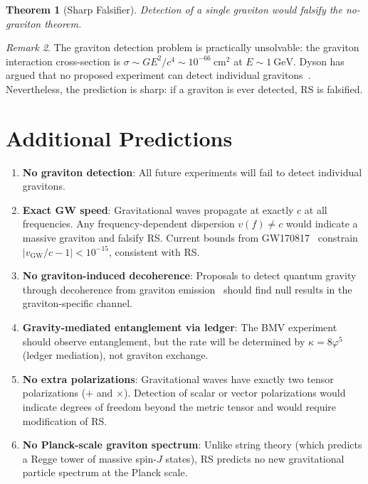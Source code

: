 \documentclass[12pt,a4paper]{article}
\newtheorem{theorem}{Theorem}[section]
\theoremstyle{definition}
\theoremstyle{remark}
\newtheorem{remark}[theorem]{Remark}
\begin{document}
\begin{theorem}[Sharp Falsifier]
\label{thm:falsifier}
Detection of a single graviton would falsify the no-graviton
theorem.
\end{theorem}

\begin{remark}
The graviton detection problem is practically unsolvable: the
graviton interaction cross-section is
$\sigma \sim G E^2/c^4 \sim 10^{-66}~\mathrm{cm}^2$ at
$E \sim 1~\mathrm{GeV}$.  Dyson has argued that no proposed
experiment can detect individual gravitons~\cite{Dyson2013}.
Nevertheless, the prediction is sharp: if a graviton is ever
detected, RS is falsified.
\end{remark}

\section{Additional Predictions}
\label{sec:predictions}

\begin{enumerate}
  \item \textbf{No graviton detection}: All future experiments
  will fail to detect individual gravitons.

  \item \textbf{Exact GW speed}: Gravitational waves propagate
  at exactly $c$ at all frequencies.  Any frequency-dependent
  dispersion $v(f) \neq c$ would indicate a massive graviton
  and falsify RS.  Current bounds from
  GW170817~\cite{GW170817speed} constrain
  $|v_{\mathrm{GW}}/c - 1| < 10^{-15}$, consistent with RS.

  \item \textbf{No graviton-induced decoherence}: Proposals to
  detect quantum gravity through decoherence from graviton
  emission~\cite{Bose2017} should find null results in the
  graviton-specific channel.

  \item \textbf{Gravity-mediated entanglement via ledger}:
  The BMV experiment should observe entanglement, but the rate
  will be determined by $\kappa = 8\varphi^5$ (ledger
  mediation), not graviton exchange.

  \item \textbf{No extra polarizations}: Gravitational waves
  have exactly two tensor polarizations ($+$ and $\times$).
  Detection of scalar or vector polarizations would indicate
  degrees of freedom beyond the metric tensor and would
  require modification of RS.

  \item \textbf{No Planck-scale graviton spectrum}: Unlike
  string theory (which predicts a Regge tower of massive
  spin-$J$ states), RS predicts no new gravitational particle
  spectrum at the Planck scale.
\end{enumerate}
\end{document}
